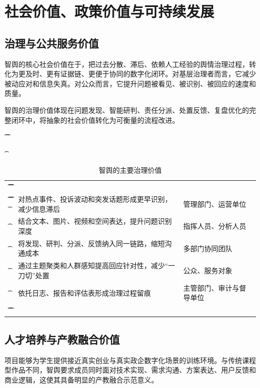 \chapter{社会价值、政策价值与可持续发展}

\section{治理与公共服务价值}

智舆的核心社会价值在于，把过去分散、滞后、依赖人工经验的舆情治理过程，转化为更及时、更有证据链、更便于协同的数字化闭环。对基层治理者而言，它减少被动应对和信息失真。对公众而言，它提升问题被看见、被识别、被回应的速度和质量。

智舆的治理价值体现在问题发现、智能研判、责任分派、处置反馈、复盘优化的完整闭环中，将抽象的社会价值转化为可衡量的流程改进。

\begin{table}[htbp]
	\t\centering
	\t\caption{智舆的主要治理价值}
	\t\begin{tabularx}{\textwidth}{|L{3cm}YL{3cm}|}
		\t\t\toprule
		\t\t{} &                &  \\
		\t\t\midrule
		\t\t{}
		\t{}          & 对热点事件、投诉波动和突发话题形成更早识别，减少信息滞后 & 管理部门、运营单位       \\
		\t{}          & 结合文本、图片、视频和空间表达，提升问题识别深度     & 指挥人员、分析人员       \\
		\t{}          & 将发现、研判、分派、反馈纳入同一链路，缩短沟通成本    & 多部门协同团队         \\
		\t{}          & 通过主题聚类和人群感知提高回应针对性，减少“一刀切”处置 & 公众、服务对象         \\
		\t{}         & 依托日志、报告和评估表形成治理过程留痕          & 主管部门、审计与督导单位    \\
		\t\t\bottomrule
		\t\end{tabularx}
\end{table}

\section{人才培养与产教融合价值}

项目能够为学生提供接近真实创业与真实政企数字化场景的训练环境。与传统课程型作品不同，智舆要求成员同时面对技术实现、需求沟通、方案表达、用户反馈和商业逻辑，这使其具备明显的产教融合示范意义。

